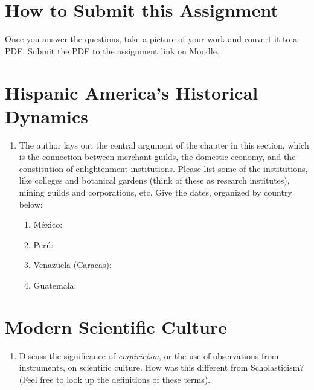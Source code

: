 \documentclass[10pt]{article}
\begin{document}
\maketitle

\section{How to Submit this Assignment}

Once you answer the questions, take a picture of your work and convert it to a PDF.  Submit the PDF to the assignment link on Moodle.

\section{Hispanic America's Historical Dynamics}

\begin{enumerate}
\item The author lays out the central argument of the chapter in this section, which is the connection between merchant guilds, the domestic economy, and the constitution of enlightenment institutions.  Please list some of the institutions, like colleges and botanical gardens (think of these as research institutes), mining guilds and corporations, etc.  Give the dates, organized by country below:
\begin{enumerate}
\item M\'{e}xico: 
\vspace{1cm}
\item Per\'{u}:
\vspace{1cm}
\item Venazuela (Caracas):
\vspace{1cm}
\item Guatemala:
\vspace{1cm}
\end{enumerate}
\end{enumerate}

\section{Modern Scientific Culture}

\begin{enumerate}
\item Discuss the significance of \textit{empiricism}, or the use of observations from instruments, on scientific culture.  How was this different from Scholasticism? (Feel free to look up the definitions of these terms). \\ \vspace{2cm}
\end{enumerate}
\end{document}

